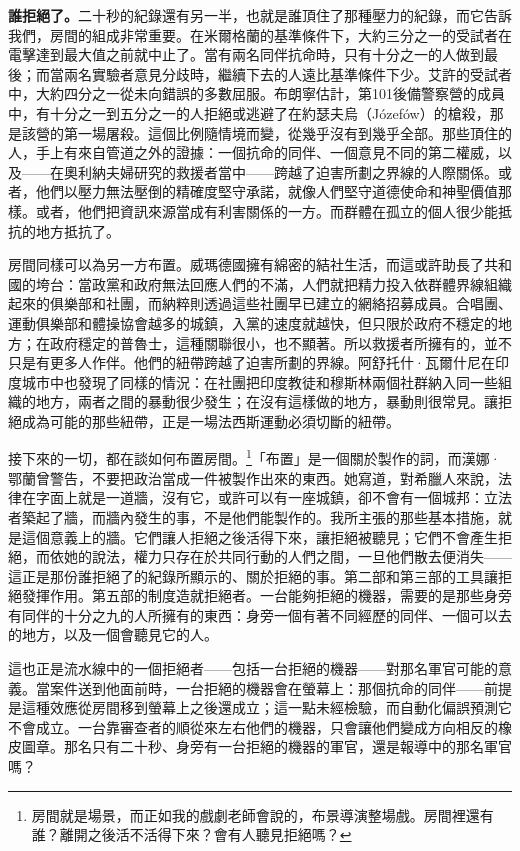 \textbf{誰拒絕了。}二十秒的紀錄還有另一半，也就是誰頂住了那種壓力的紀錄，而它告訴我們，房間的組成非常重要。在米爾格蘭的基準條件下，大約三分之一的受試者在電擊達到最大值之前就中止了。當有兩名同伴抗命時，只有十分之一的人做到最後；而當兩名實驗者意見分歧時，繼續下去的人遠比基準條件下少\autocite{milgram1974obedience}。艾許的受試者中，大約四分之一從未向錯誤的多數屈服\autocite{asch1956studies}。布朗寧估計，第101後備警察營的成員中，有十分之一到五分之一的人拒絕或逃避了在約瑟夫烏（Józefów）的槍殺，那是該營的第一場屠殺\autocite{browning1992ordinary}。這個比例隨情境而變，從幾乎沒有到幾乎全部。那些頂住的人，手上有來自管道之外的證據：一個抗命的同伴、一個意見不同的第二權威，以及——在奧利納夫婦研究的救援者當中——跨越了迫害所劃之界線的人際關係\autocite{oliner1988altruistic}。或者，他們以壓力無法壓倒的精確度堅守承諾，就像人們堅守道德使命和神聖價值那樣\autocite{skitka2009limits,ginges2007sacred}。或者，他們把資訊來源當成有利害關係的一方。而群體在孤立的個人很少能抵抗的地方抵抗了\autocite{gamson1982encounters}。

房間同樣可以為另一方布置。威瑪德國擁有綿密的結社生活，而這或許助長了共和國的垮台：當政黨和政府無法回應人們的不滿，人們就把精力投入依群體界線組織起來的俱樂部和社團，而納粹則透過這些社團早已建立的網絡招募成員\autocite{berman1997weimar}。合唱團、運動俱樂部和體操協會越多的城鎮，入黨的速度就越快，但只限於政府不穩定的地方；在政府穩定的普魯士，這種關聯很小，也不顯著\autocite{satyanath2017bowling}。所以救援者所擁有的，並不只是有更多人作伴。他們的紐帶跨越了迫害所劃的界線。阿舒托什·瓦爾什尼在印度城市中也發現了同樣的情況：在社團把印度教徒和穆斯林兩個社群納入同一些組織的地方，兩者之間的暴動很少發生；在沒有這樣做的地方，暴動則很常見\autocite{varshney2002ethnic}。讓拒絕成為可能的那些紐帶，正是一場法西斯運動必須切斷的紐帶。

接下來的一切，都在談如何布置房間。\footnote{房間就是場景，而正如我的戲劇老師會說的，布景導演整場戲。房間裡還有誰？離開之後活不活得下來？會有人聽見拒絕嗎？}「布置」是一個關於製作的詞，而漢娜·鄂蘭曾警告，不要把政治當成一件被製作出來的東西。她寫道，對希臘人來說，法律在字面上就是一道牆，沒有它，或許可以有一座城鎮，卻不會有一個城邦\autocite{arendt1958human}：立法者築起了牆，而牆內發生的事，不是他們能製作的。我所主張的那些基本措施，就是這個意義上的牆。它們讓人拒絕之後活得下來，讓拒絕被聽見；它們不會產生拒絕，而依她的說法，權力只存在於共同行動的人們之間，一旦他們散去便消失——這正是那份誰拒絕了的紀錄所顯示的、關於拒絕的事。第二部和第三部的工具讓拒絕發揮作用。第五部的制度造就拒絕者。一台能夠拒絕的機器，需要的是那些身旁有同伴的十分之九的人所擁有的東西：身旁一個有著不同經歷的同伴、一個可以去的地方，以及一個會聽見它的人。

這也正是流水線中的一個拒絕者——包括一台拒絕的機器——對那名軍官可能的意義。當案件送到他面前時，一台拒絕的機器會在螢幕上：那個抗命的同伴——前提是這種效應從房間移到螢幕上之後還成立；這一點未經檢驗，而自動化偏誤預測它不會成立。一台靠審查者的順從來左右他們的機器，只會讓他們變成方向相反的橡皮圖章。那名只有二十秒、身旁有一台拒絕的機器的軍官，還是報導中的那名軍官嗎？

